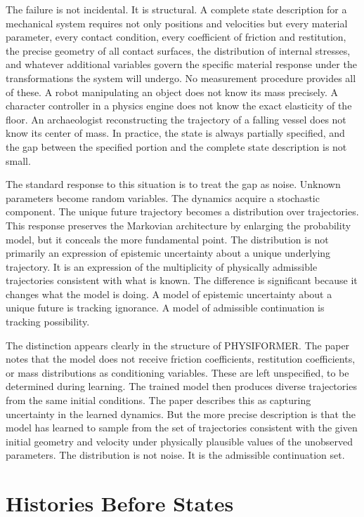 \documentclass[12pt,oneside]{article}
\theoremstyle{definition}
\begin{document}
The failure is not incidental. It is structural. A complete state description for a
mechanical system requires not only positions and velocities but every material parameter,
every contact condition, every coefficient of friction and restitution, the precise geometry
of all contact surfaces, the distribution of internal stresses, and whatever additional
variables govern the specific material response under the transformations the system will
undergo. No measurement procedure provides all of these. A robot manipulating an object
does not know its mass precisely. A character controller in a physics engine does not know
the exact elasticity of the floor. An archaeologist reconstructing the trajectory of a
falling vessel does not know its center of mass. In practice, the state is always partially
specified, and the gap between the specified portion and the complete state description is
not small.

The standard response to this situation is to treat the gap as noise. Unknown parameters
become random variables. The dynamics acquire a stochastic component. The unique future
trajectory becomes a distribution over trajectories. This response preserves the Markovian
architecture by enlarging the probability model, but it conceals the more fundamental point.
The distribution is not primarily an expression of epistemic uncertainty about a unique
underlying trajectory. It is an expression of the multiplicity of physically admissible
trajectories consistent with what is known. The difference is significant because it changes
what the model is doing. A model of epistemic uncertainty about a unique future is tracking
ignorance. A model of admissible continuation is tracking possibility.

The distinction appears clearly in the structure of PHYSIFORMER. The paper notes that the
model does not receive friction coefficients, restitution coefficients, or mass distributions
as conditioning variables. These are left unspecified, to be determined during learning. The
trained model then produces diverse trajectories from the same initial conditions. The paper
describes this as capturing uncertainty in the learned dynamics. But the more precise
description is that the model has learned to sample from the set of trajectories consistent
with the given initial geometry and velocity under physically plausible values of the
unobserved parameters. The distribution is not noise. It is the admissible continuation set.

\section{Histories Before States}
\end{document}

